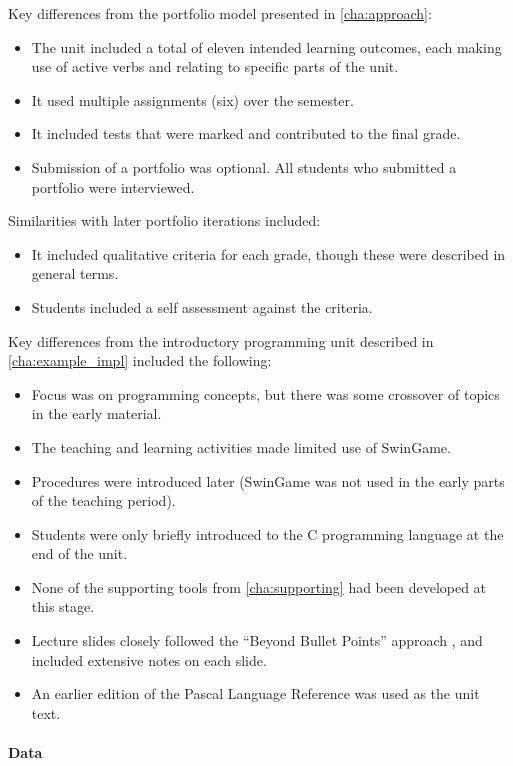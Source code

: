 Key differences from the portfolio model presented in \cref{cha:approach}:
\begin{itemize}[noitemsep,nolistsep]
  \item The unit included a total of eleven intended learning outcomes, each making use of active verbs and relating to specific parts of the unit.
  \item It used multiple assignments (six) over the semester.
  \item It included tests that were marked and contributed to the final grade.
  \item Submission of a portfolio was optional.  All students who submitted a portfolio were interviewed.
\end{itemize}

Similarities with later portfolio iterations included:
\begin{itemize}[noitemsep,nolistsep]
  \item It included qualitative criteria for each grade, though these were described in general terms.
  \item Students included a self assessment against the criteria.
\end{itemize}

Key differences from the introductory programming unit described in \cref{cha:example_impl} included the following:
\begin{itemize}[noitemsep,nolistsep]
	\item Focus was on programming concepts, but there was some crossover of topics in the early material.
	\item The teaching and learning activities made limited use of SwinGame.
	\item Procedures were introduced later (SwinGame was not used in the early parts of the teaching period). 
	\item Students were only briefly introduced to the C programming language at the end of the unit.
	\item None of the supporting tools from \cref{cha:supporting} had been developed at this stage.
	\item Lecture slides closely followed the ``Beyond Bullet Points'' approach \cite{Atkinson:2007}, and included extensive notes on each slide.
	\item An earlier edition of the Pascal Language Reference \cite{FPC:2013lang} was used as the unit text.
\end{itemize}

\paragraph{Data} %

